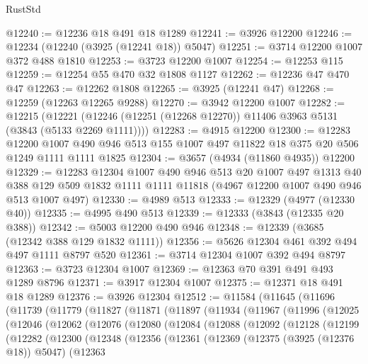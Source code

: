\begin{lexlean}{RustStd}
\begin{coremodule}
@12240 := @12236 @18 @491 @18 @1289
@12241 := @3926 @12200
@12246 := @12234 (@12240 (@3925 (@12241 @18)) @5047)
@12251 := @3714 @12200 @1007 @372 @488 @1810
@12253 := @3723 @12200 @1007
@12254 := @12253 @115
@12259 := @12254 @55 @470 @32 @1808 @1127
@12262 := @12236 @47 @470 @47
@12263 := @12262 @1808
@12265 := @3925 (@12241 @47)
@12268 := @12259 (@12263 @12265 @9288)
@12270 := @3942 @12200 @1007
@12282 := @12215
    (@12221 (@12246 (@12251 (@12268 @12270)) @11406 @3963 @5131 (@3843 (@5133 @2269 @1111))))
@12283 := @4915 @12200
@12300 := @12283
    @12200
    @1007
    @490
    @946
    @513
    @155
    @1007
    @497
    @11822
    @18
    @375
    @20
    @506
    @1249
    @1111
    @1111
    @1825
@12304 := @3657 (@4934 (@11860 @4935)) @12200
@12329 := @12283
    @12304
    @1007
    @490
    @946
    @513
    @20
    @1007
    @497
    @1313
    @40
    @388
    @129
    @509
    @1832
    @1111
    @1111
    @11818
    (@4967 @12200 @1007 @490 @946 @513 @1007 @497)
@12330 := @4989 @513
@12333 := @12329 (@4977 (@12330 @40))
@12335 := @4995 @490 @513
@12339 := @12333 (@3843 (@12335 @20 @388))
@12342 := @5003 @12200 @490 @946
@12348 := @12339 (@3685 (@12342 @388 @129 @1832 @1111))
@12356 := @5626 @12304 @461 @392 @494 @497 @1111 @8797 @520
@12361 := @3714 @12304 @1007 @392 @494 @8797
@12363 := @3723 @12304 @1007
@12369 := @12363 @70 @391 @491 @493 @1289 @8796
@12371 := @3917 @12304 @1007
@12375 := @12371 @18 @491 @18 @1289
@12376 := @3926 @12304
@12512 := @11584
    (@11645
      (@11696
        (@11739
          (@11779
            (@11827
              (@11871
                (@11897
                  (@11934
                    (@11967
                      (@11996
                        (@12025
                          (@12046
                            (@12062
                              (@12076
                                (@12080
                                  (@12084
                                    (@12088
                                      (@12092
                                        (@12128
                                          (@12199
                                            (@12282
                                              (@12300
                                                (@12348
                                                  (@12356
                                                    (@12361
                                                      (@12369
                                                        (@12375 (@3925 (@12376 @18)) @5047)
                                                        (@12363

\end{coremodule}
\end{lexlean}
